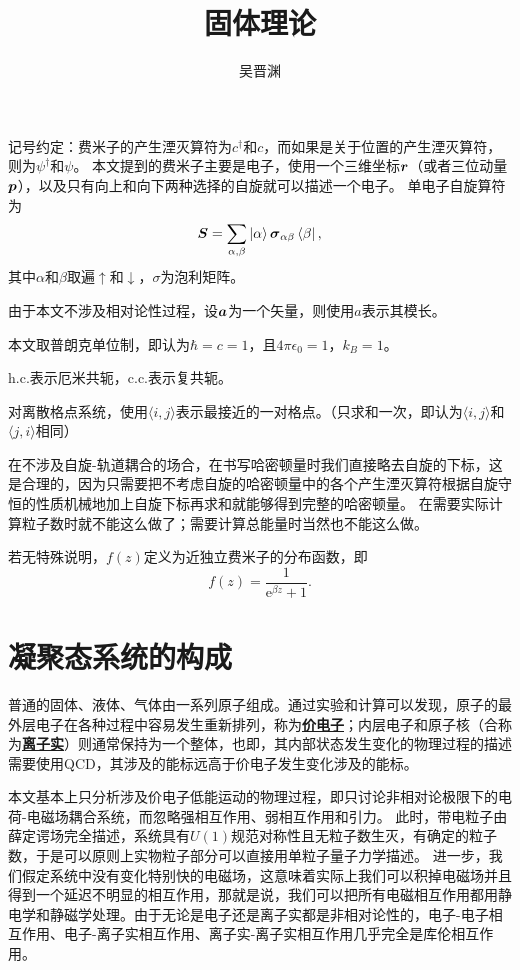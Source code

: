 \documentclass[hyperref, UTF8, a4paper]{ctexart}
\title{固体理论}
\author{吴晋渊}
\newcommand*{\ee}{\mathrm{e}}
\newcommand*{\pair}[1]{\langle #1 \rangle}
\newcommand*{\concept}[1]{\underline{\textbf{#1}}}
\begin{document}
\maketitle

记号约定：费米子的产生湮灭算符为${c}^\dagger$和${c}$，而如果是关于位置的产生湮灭算符，则为${\psi}^\dagger$和${\psi}$。
本文提到的费米子主要是电子，使用一个三维坐标$\vb*{r}$（或者三位动量$\vb*{p}$），以及只有向上和向下两种选择的自旋就可以描述一个电子。
单电子自旋算符为
\[
    {\vb*{S}} = \sum_{\alpha, \beta} \ket{\alpha} \vb*{\sigma}_{\alpha \beta} \bra{\beta},
\]
其中$\alpha$和$\beta$取遍$\uparrow$和$\downarrow$，$\sigma$为泡利矩阵。

由于本文不涉及相对论性过程，设$\vb*{a}$为一个矢量，则使用$a$表示其模长。

本文取普朗克单位制，即认为$\hbar=c=1$，且$4\pi\epsilon_0=1$，$k_B=1$。

$\text{h.c.}$表示厄米共轭，$\text{c.c.}$表示复共轭。

对离散格点系统，使用$\pair{i, j}$表示最接近的一对格点。（只求和一次，即认为$\pair{i, j}$和$\pair{j, i}$相同）

在不涉及自旋-轨道耦合的场合，在书写哈密顿量时我们直接略去自旋的下标，这是合理的，因为只需要把不考虑自旋的哈密顿量中的各个产生湮灭算符根据自旋守恒的性质机械地加上自旋下标再求和就能够得到完整的哈密顿量。
在需要实际计算粒子数时就不能这么做了；需要计算总能量时当然也不能这么做。

若无特殊说明，$f(z)$定义为近独立费米子的分布函数，即
\[
    f(z) = \frac{1}{\ee^{\beta z} + 1}.
\]

\section{凝聚态系统的构成}

普通的固体、液体、气体由一系列原子组成。通过实验和计算可以发现，原子的最外层电子在各种过程中容易发生重新排列，称为\concept{价电子}；内层电子和原子核（合称为\concept{离子实}）则通常保持为一个整体，也即，其内部状态发生变化的物理过程的描述需要使用QCD，其涉及的能标远高于价电子发生变化涉及的能标。

本文基本上只分析涉及价电子低能运动的物理过程，即只讨论非相对论极限下的电荷-电磁场耦合系统，而忽略强相互作用、弱相互作用和引力。
此时，带电粒子由薛定谔场完全描述，系统具有$U(1)$规范对称性且无粒子数生灭，有确定的粒子数，于是可以原则上实物粒子部分可以直接用单粒子量子力学描述。
进一步，我们假定系统中没有变化特别快的电磁场，这意味着实际上我们可以积掉电磁场并且得到一个延迟不明显的相互作用，那就是说，我们可以把所有电磁相互作用都用静电学和静磁学处理。由于无论是电子还是离子实都是非相对论性的，电子-电子相互作用、电子-离子实相互作用、离子实-离子实相互作用几乎完全是库伦相互作用。
\end{document}

